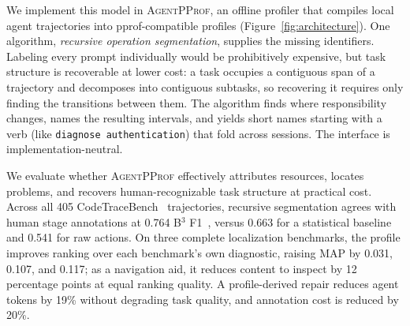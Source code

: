 \documentclass[sigconf,nonacm]{acmart}
\newcommand{\sys}{\textsc{AgentPProf}\xspace}
\begin{document}
We implement this model in \sys, an offline profiler that compiles
local agent trajectories into pprof-compatible profiles
(Figure~\ref{fig:architecture}).
One algorithm, \emph{recursive operation segmentation}, supplies the missing identifiers.
Labeling every prompt individually would be prohibitively expensive, but task structure is recoverable at lower cost: a task occupies a contiguous span of a trajectory and decomposes into contiguous subtasks, so recovering it requires only finding the transitions between them.
The algorithm finds where responsibility changes, names the resulting intervals, and yields short names starting with a verb (like \texttt{diagnose authentication}) that fold across sessions. The interface is implementation-neutral.

We evaluate whether \sys effectively attributes resources, locates problems, and recovers human-recognizable task structure at practical cost.
Across all 405 CodeTraceBench~\cite{li2026codetracer} trajectories, recursive segmentation agrees with human stage annotations at 0.764 B$^3$ F1~\cite{bagga-baldwin-1998-entity-based}, versus 0.663 for a statistical baseline and 0.541 for raw actions.
On three complete localization benchmarks, the profile improves ranking over each benchmark's own diagnostic, raising MAP by 0.031, 0.107, and 0.117; as a navigation aid, it reduces content to inspect by 12 percentage points at equal ranking quality.
A profile-derived repair reduces agent tokens by 19\% without degrading task quality, and annotation cost is reduced by 20\%.
\end{document}
